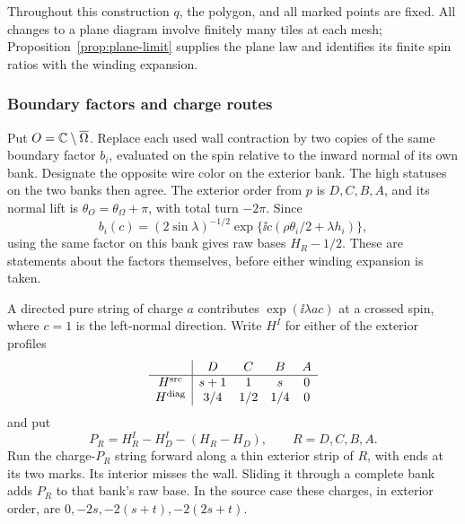 Throughout this construction $q$, the polygon, and all marked
points are fixed.  All changes to a plane diagram involve finitely many
tiles at each mesh; Proposition~\ref{prop:plane-limit} supplies the plane
law and identifies its finite spin ratios with the winding expansion.

\subsubsection{Boundary factors and charge routes}

Put $O=\mathbb C\setminus\overline\Omega$.  Replace each used wall contraction
by two copies of the same boundary factor $b_i$, evaluated on the spin
relative to the inward normal of its own bank.  Designate the opposite
wire color on the exterior bank.  The high statuses on the two banks
then agree.  The exterior order from $p$ is $D,C,B,A$, and its normal
lift is $\theta_O=\theta_\Omega+\pi$, with total turn $-2\pi$.
Since
\[
 b_i(c)=(2\sin\lambda)^{-1/2}
       \exp\{\ii c(\rho\theta_i/2+\lambda h_i)\},
\]
using the same factor on this bank gives raw bases $H_R-1/2$.
These are statements about the factors themselves, before either
winding expansion is taken.

A directed pure string of charge $a$ contributes
$\exp(\ii\lambda ac)$ at a crossed spin, where $c=1$ is the
left-normal direction.  Write $H^I$ for either of the exterior profiles
\begin{equation}
\begin{array}{c|cccc}
 &D&C&B&A\\ \hline
 H^{\rm src}&s+1&1&s&0\\
 H^{\rm diag}&3/4&1/2&1/4&0
\end{array}
\label{obs:exterior-profiles}
\end{equation}
and put
\begin{equation}
 P_R=H_R^I-H_D^I-(H_R-H_D),\qquad R=D,C,B,A.
 \label{obs:short-strings}
\end{equation}
Run the charge-$P_R$ string forward along a thin exterior strip of
$R$, with ends at its two marks.  Its interior misses the wall.
Sliding it through a complete bank adds $P_R$ to that bank's raw
base.  In the source case these charges, in exterior order, are
$0,-2s,-2(s+t),-2(2s+t)$.

